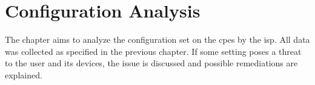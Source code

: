 \section{Configuration Analysis}
\label{section:config_analysis}

The chapter aims to analyze the configuration set on the \glspl{cpe} by the \gls{isp}. All data was collected as specified in the previous chapter. If some setting poses a threat to the user and its devices, the issue is discussed and possible remediations are explained.







